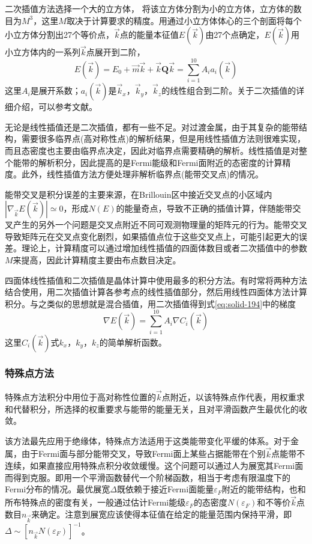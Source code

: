 二次插值方法选择一个大的立方体，%
将该立方体分割为小的立方体，立方体的数目为$M^3$，这里$M$取决于计算要求的精度。用通过小立方体体心的三个剖面将每个小立方体分割出27个等价点，$\vec k$点的能量本征值$E(\vec k)$由27个点确定，$E(\vec k)$用小立方体内的一系列$\vec k$点展开到二阶，
\begin{equation}
  E(\vec k)=E_0+\vec m\vec k+\vec k\mathbf Q\vec k=\sum_{i=1}^{10}A_ia_i(\vec k)
  \label{eq:solid-203}
\end{equation}
这里$A_i$是展开系数；$a_i(\vec k)$是$\vec k_x$，$\vec k_y$，$\vec k_z$的线性组合到二阶。关于二次插值的详细介绍，可以参考文献\cite{AP67-15_1971}。

无论是线性插值还是二次插值，都有一些不足。对过渡金属，由于其复杂的能带结构，需要很多临界点(高对称性点)的解析结果，但是用线性插值方法则很难实现，而且态密度也主要由临界点决定，因此对临界点需要精确的解析。线性插值是对整个能带的解析积分，因此提高的是Fermi能级和Fermi面附近的态密度的计算精度。此外，线性插值方法方便处理非解析临界点(能带交叉点)的情况\cite{PLA28-570_1969,PRB7-891_1973,PRB5-1276_1972}。

能带交叉是积分误差的主要来源，在Brillouin区中接近交叉点的小区域内$|\nabla_{\vec k}E(\vec k)|\simeq0$，形成$N(E)$的能量奇点，导致不正确的插值计算，伴随能带交叉产生的另外一个问题是交叉点附近不同可观测物理量的矩阵元的行为。能带交叉导致矩阵元在交叉点变化剧烈，如果插值点位于这些交叉点上，可能引起更大的误差。理论上，计算精度可以通过增加线性插值的四面体数目或者二次插值中的参数$M$来提高，因此计算精度主要由布点数目决定。

四面体线性插值和二次插值是晶体计算中使用最多的积分方法。有时常将两种方法结合使用，用二次插值计算各参考点的线性插值部分，然后用线性四面体方法计算积分。与之类似的思想就是混合插值，用二次插值得到式\eqref{eq:solid-194}中的梯度
\begin{equation}
  \nabla E(\vec k)=\sum_{i=1}^{10}A_i\nabla C_i(\vec k)
  \label{eq:solid-204}
\end{equation}
这里$C_i(\vec k)$式$k_x$，$k_y$，$k_z$的简单解析函数。

\subsubsection{特殊点方法}
特殊点方法积分中用位于高对称性位置的$\vec k$点附近，以该特殊点作代表，用权重求和代替积分，所选择的权重要求与能带的能量无关，且对平滑函数产生最优化的收敛\cite{PRB13-5188_1976,PRB16-1748_1977}。

该方法最先应用于绝缘体，特殊点方法适用于这类能带变化平缓的体系。对于金属，由于Fermi面与部分能带交叉，导致Fermi面上某些占据能带在个别$\vec k$点能带不连续，如果直接应用特殊点积分收敛缓慢。这个问题可以通过人为展宽其Fermi面而得到克服。即用一个平滑函数替代一个阶梯函数，相当于考虑有限温度下的Fermi分布的情况。最优展宽$\Delta$既依赖于接近Fermi面能量$\varepsilon_F$附近的能带结构，也和所布特殊点的密度有关，一般通过估计Fermi能级$\varepsilon_F$的态密度$N(\varepsilon_F)$和不等价$\vec k$点数目$n_{\vec k}$来确定。注意到展宽应该使得本征值在给定的能量范围内保持平滑，即$\Delta\sim[n_{\vec k}N(\varepsilon_F)]^{-1}$。


